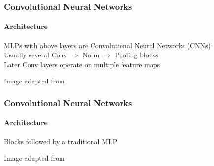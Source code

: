 \documentclass[xetex,professionalfont]{beamer}
\begin{document}
\begin{frame}
\frametitle{Convolutional Neural Networks}
\framesubtitle{Architecture}


MLPs with above layers are Convolutional Neural Networks (CNNs)\\\medskip
Usually several Conv $\Rightarrow$ Norm $\Rightarrow$ Pooling blocks\\\medskip
Later Conv layers operate on multiple feature maps %

\medskip
\begin{center}
    {\centering Image adapted from \cite{kavukcuoglu2011}}
\end{center}

\end{frame}


\begin{frame}
\frametitle{Convolutional Neural Networks}
\framesubtitle{Architecture}

Blocks followed by a traditional MLP

\bigskip
\begin{center}
    {\centering Image adapted from \cite{sermanet2012}} %
\end{center}

\end{frame}
\end{document}
